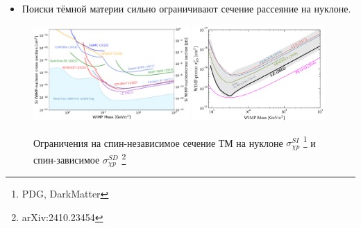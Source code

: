 \begin{itemize}
	\item Поиски тёмной материи сильно ограничивают сечение рассеяние на нуклоне.
\end{itemize}

\begin{figure}
	\includegraphics[width=0.53\textwidth]{images/pdg_si_limits.pdf}
	\includegraphics[width=0.45\textwidth]{images/DirectSD.png}
	\caption{Ограничения на спин-независимое сечение ТМ на нуклоне $\sigma^{SI}_{\chi p}$ \footnote{PDG, DarkMatter} и спин-зависимое $\sigma^{SD}_{\chi p}$ \footnote{arXiv:2410.23454}}
\end{figure}

